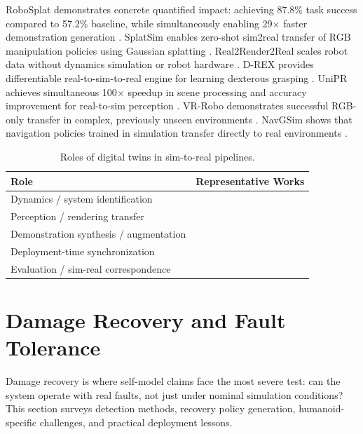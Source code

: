 \documentclass[12pt,a4paper,oneside]{report}
\begin{document}
RoboSplat demonstrates concrete quantified impact: achieving 87.8\% task success compared to 57.2\% baseline, while simultaneously enabling 29$\times$ faster demonstration generation \cite{yang2025robosplat}. SplatSim enables zero-shot sim2real transfer of RGB manipulation policies using Gaussian splatting \cite{qureshi2025splatsim}. Real2Render2Real scales robot data without dynamics simulation or robot hardware \cite{yu2025real2render2real}. D-REX provides differentiable real-to-sim-to-real engine for learning dexterous grasping \cite{lou2026drex}. UniPR achieves simultaneous 100$\times$ speedup in scene processing and accuracy improvement for real-to-sim perception \cite{zhang2025unipr}. VR-Robo demonstrates successful RGB-only transfer in complex, previously unseen environments \cite{zhu2025vrrobo}. NavGSim shows that navigation policies trained in simulation transfer directly to real environments \cite{liu2025navgsim}.
\begin{table}[H]
\centering

\caption{Roles of digital twins in sim-to-real pipelines.}
\label{tab:digital_twin_roles}
\begin{tabular}{p{3.5cm}p{8cm}}
\toprule

\textbf{Role} & \textbf{Representative Works} \\
\midrule

Dynamics / system identification & \cite{tan2018simtoreal, heiden2022inferring, lou2026drex} \\

Perception / rendering transfer & \cite{qureshi2025splatsim, tang2025semantic} \\

Demonstration synthesis / augmentation & \cite{yang2025robosplat, yu2025real2render2real} \\

Deployment-time synchronization & \cite{abou2024realissim} \\

Evaluation / sim-real correspondence & \cite{jain2025polaris, li2024simpler} \\
\bottomrule

\end{tabular}
\end{table}
\section{Damage Recovery and Fault Tolerance}

Damage recovery is where self-model claims face the most severe test: can the system operate with real faults, not just under nominal simulation conditions? This section surveys detection methods, recovery policy generation, humanoid-specific challenges, and practical deployment lessons.
\end{document}
